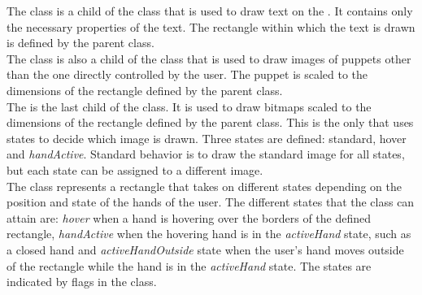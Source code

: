 The  class is a child of the  class that is used to draw text on the . It contains only the necessary properties of the text. The rectangle within which the text is drawn is defined by the parent class.\\

The  class is also a child of the  class that is used to draw images of puppets other than the one directly controlled by the user. The puppet is scaled to the dimensions of the rectangle defined by the parent class.\\

The  is the last child of the  class. It is used to draw bitmaps scaled to the dimensions of the rectangle defined by the parent class. This is the only  that uses states to decide which image is drawn. Three states are defined: standard, hover and \emph{handActive}. Standard behavior is to draw the standard image for all states, but each state can be assigned to a different image.\\

The  class represents a rectangle that takes on different states depending on the position and state of the hands of the user. The different states that the class can attain are: \emph{hover} when a hand is hovering over the borders of the defined rectangle, \emph{handActive} when the hovering hand is in the \emph{activeHand} state, such as a closed hand and \emph{activeHandOutside} state when the user's hand moves outside of the rectangle while the hand is in the \emph{activeHand} state. The states are indicated by flags in the class.\\

